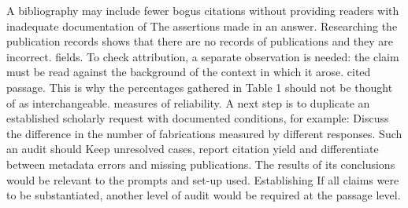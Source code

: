 \documentclass[acmsmall,screen,nonacm]{acmart}
\begin{document}
A bibliography may include fewer bogus citations without providing readers with inadequate documentation of The assertions made in an answer. Researching the publication records shows that there are no records of publications and they are incorrect. fields. To check attribution, a separate observation is needed: the claim must be read against the background of the context in which it arose. cited passage. This is why the percentages gathered in Table 1 should not be thought of as interchangeable. measures of reliability. A next step is to duplicate an established scholarly request with documented conditions, for example: Discuss the difference in the number of fabrications measured by different responses. Such an audit should Keep unresolved cases, report citation yield and differentiate between metadata errors and missing publications. The results of its conclusions would be relevant to the prompts and set-up used. Establishing If all claims were to be substantiated, another level of audit would be required at the passage level.

\end{document}
